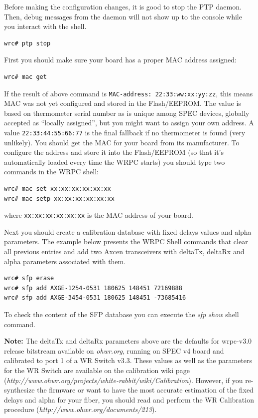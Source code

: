 \documentclass[a4paper, 12pt]{article}
\newcommand{\codeHook}[1]{\mbox{\ttfamily\MakeTextUppercase{#1}}}
\begin{document}
\vspace{1em}
Before making the configuration changes, it is good to stop the \codeHook{ptp} daemon.
Then, debug messages from the daemon will not show up to the console while you
interact with the shell.

\begin{lstlisting}
wrc# ptp stop
\end{lstlisting}

\vspace{1em}
First you should make sure your board has a proper \codeHook{mac} address assigned:
\begin{lstlisting}
wrc# mac get
\end{lstlisting}
If the result of above command is \texttt{MAC-address: 22:33:ww:xx:yy:zz}, this means
\codeHook{mac} was not yet configured and stored in the Flash/EEPROM. The value is
based on thermometer serial number as is unique among SPEC devices,
globally accepted as ``locally assigned'', but you might want to assign your own address. A value \texttt{22:33:44:55:66:77} is the final fallback if no
thermometer is found (very unlikely). You should get
the \codeHook{mac} for your board from its manufacturer. To configure the address and
store it into the Flash/EEPROM (so that it's automatically loaded every time the
\codeHook{wrpc} starts) you should type two commands in the \codeHook{wrpc} shell:
\begin{lstlisting}
wrc# mac set xx:xx:xx:xx:xx:xx
wrc# mac setp xx:xx:xx:xx:xx:xx
\end{lstlisting}
where \texttt{xx:xx:xx:xx:xx:xx} is the \codeHook{mac} address of your board.

\vspace{1em}
Next you should create a calibration database with fixed delays values and
alpha parameters. The example below presents the \codeHook{wrpc} Shell commands that
clear all previous entries and add two Axcen transceivers with deltaTx, deltaRx
and alpha parameters associated with them.

\begin{lstlisting}
wrc# sfp erase
wrc# sfp add AXGE-1254-0531 180625 148451 72169888
wrc# sfp add AXGE-3454-0531 180625 148451 -73685416
\end{lstlisting}

To check the content of the \codeHook{sfp} database you can execute the \textit{sfp show} shell
command.

\textbf{Note:} The deltaTx and deltaRx parameters above are the defaults for
wrpc-v3.0 release bitstream available on \textit{ohwr.org}, running on
\codeHook{spec} v4 board and calibrated to port 1 of a \codeHook{wr} Switch v3.3. These
values as well as the parameters for the \codeHook{wr} Switch are available on the
calibration wiki page
(\textit{http://www.ohwr.org/projects/white-rabbit/wiki/Calibration}). However, if
you re-synthesize the firmware or want to have the most accurate estimation of
the fixed delays and alpha for your fiber, you should read and perform the
\codeHook{wr} Calibration procedure (\textit{http://www.ohwr.org/documents/213}).
\end{document}
